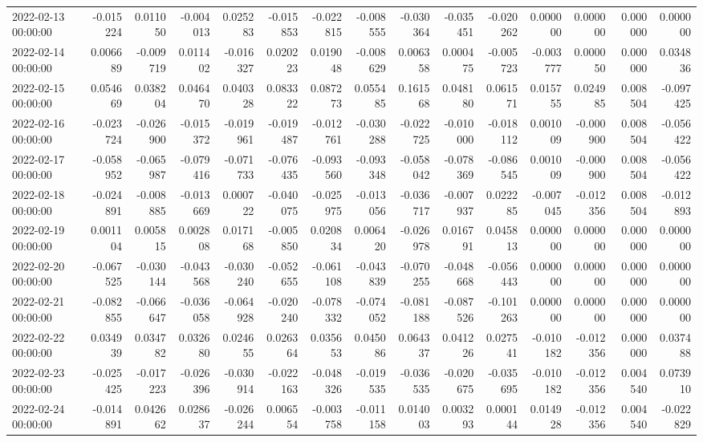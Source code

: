 \begin{tabular}{lrrrrrrrrrrrrrr}
2022-02-13 00:00:00 & -0.015224 & 0.011050 & -0.004013 & 0.025283 & -0.015853 & -0.022815 & -0.008555 & -0.030364 & -0.035451 & -0.020262 & 0.000000 & 0.000000 & 0.000000 & 0.000000 \\
2022-02-14 00:00:00 & 0.006689 & -0.009719 & 0.011402 & -0.016327 & 0.020223 & 0.019048 & -0.008629 & 0.006358 & 0.000475 & -0.005723 & -0.003777 & 0.000050 & 0.000000 & 0.034836 \\
2022-02-15 00:00:00 & 0.054669 & 0.038204 & 0.046470 & 0.040328 & 0.083322 & 0.087273 & 0.055485 & 0.161568 & 0.048180 & 0.061571 & 0.015755 & 0.024985 & 0.008504 & -0.097425 \\
2022-02-16 00:00:00 & -0.023724 & -0.026900 & -0.015372 & -0.019961 & -0.019487 & -0.012761 & -0.030288 & -0.022725 & -0.010000 & -0.018112 & 0.001009 & -0.000900 & 0.008504 & -0.056422 \\
2022-02-17 00:00:00 & -0.058952 & -0.065987 & -0.079416 & -0.071733 & -0.076435 & -0.093560 & -0.093348 & -0.058042 & -0.078369 & -0.086545 & 0.001009 & -0.000900 & 0.008504 & -0.056422 \\
2022-02-18 00:00:00 & -0.024891 & -0.008885 & -0.013669 & 0.000722 & -0.040075 & -0.025975 & -0.013056 & -0.036717 & -0.007937 & 0.022285 & -0.007045 & -0.012356 & 0.008504 & -0.012893 \\
2022-02-19 00:00:00 & 0.001104 & 0.005815 & 0.002808 & 0.017168 & -0.005850 & 0.020834 & 0.006420 & -0.026978 & 0.016791 & 0.045813 & 0.000000 & 0.000000 & 0.000000 & 0.000000 \\
2022-02-20 00:00:00 & -0.067525 & -0.030144 & -0.043568 & -0.030240 & -0.052655 & -0.061108 & -0.043839 & -0.070255 & -0.048668 & -0.056443 & 0.000000 & 0.000000 & 0.000000 & 0.000000 \\
2022-02-21 00:00:00 & -0.082855 & -0.066647 & -0.036058 & -0.064928 & -0.020240 & -0.078332 & -0.074052 & -0.081188 & -0.087526 & -0.101263 & 0.000000 & 0.000000 & 0.000000 & 0.000000 \\
2022-02-22 00:00:00 & 0.034939 & 0.034782 & 0.032680 & 0.024655 & 0.026364 & 0.035653 & 0.045086 & 0.064337 & 0.041226 & 0.027541 & -0.010182 & -0.012356 & 0.000000 & 0.037488 \\
2022-02-23 00:00:00 & -0.025425 & -0.017223 & -0.026396 & -0.030914 & -0.022163 & -0.048326 & -0.019535 & -0.036535 & -0.020675 & -0.035695 & -0.010182 & -0.012356 & 0.004540 & 0.073910 \\
2022-02-24 00:00:00 & -0.014891 & 0.042662 & 0.028637 & -0.026244 & 0.006554 & -0.003758 & -0.011158 & 0.014003 & 0.003293 & 0.000144 & 0.014928 & -0.012356 & 0.004540 & -0.022829 \\

\end{tabular}
